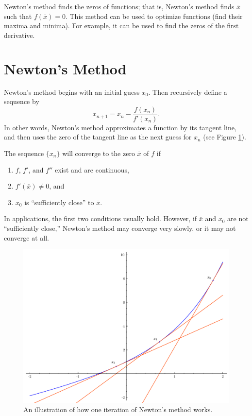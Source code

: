 \label{lab:NewtonsMethod}

Newton's method finds the zeros of functions; that is, Newton's method finds $\overline{x}$ such that $f\left(\overline{x}\right) = 0$.
This method can be used to optimize functions (find their maxima and minima).  For example, it can be used to find the zeros of the first derivative.

\section*{Newton's Method}
Newton's method begins with an initial guess $x_0$. 
Then recursively define a sequence by
\[
x_{n+1} = x_n - \frac{f(x_n)}{f'(x_n)}.
\]
In other words, Newton's method approximates a function by its tangent line, and then uses the zero of the tangent line as the next guess for $x_n$ (see Figure \ref{fig:newton}).

The sequence $\{x_n\}$ will converge to the zero $\overline{x}$ of $f$ if
\begin{enumerate}
\item $f$, $f'$, and $f''$ exist and are continuous,
\item $f'(\overline{x})\neq0$, and
\item $x_0$ is ``sufficiently close'' to $\overline{x}$.
\end{enumerate}
In applications, the first two conditions usually hold.
However, if $\overline{x}$ and $x_0$ are not ``sufficiently close,'' Newton's method may converge very slowly, or it may not converge at all.

\begin{figure}[h]
\label{fig:newton}
\centering
\includegraphics[width=\textwidth]{newton_iters}
\caption{An illustration of how one iteration of Newton's method works.}
\end{figure}

